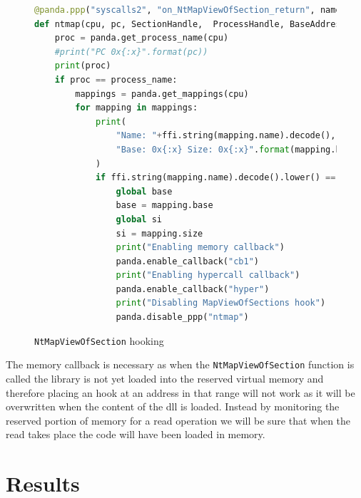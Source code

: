 \begin{figure}[htp]
\centering
\begin{lstlisting}[language=Python] 
@panda.ppp("syscalls2", "on_NtMapViewOfSection_return", name="ntmap")
def ntmap(cpu, pc, SectionHandle,  ProcessHandle, BaseAddress, ZeroBits, CommitSize, SectionOffset, ViewSize, InheritDisposition, AllocationType, Win32Protect):
    proc = panda.get_process_name(cpu)
    #print("PC 0x{:x}".format(pc))
    print(proc)
    if proc == process_name:
        mappings = panda.get_mappings(cpu)
        for mapping in mappings:
            print(
                "Name: "+ffi.string(mapping.name).decode(),
                "Base: 0x{:x} Size: 0x{:x}".format(mapping.base,mapping.size)
            )
            if ffi.string(mapping.name).decode().lower() == "kernel32.dll":
                global base
                base = mapping.base
                global si
                si = mapping.size
                print("Enabling memory callback")
                panda.enable_callback("cb1")
                print("Enabling hypercall callback")
                panda.enable_callback("hyper")
                print("Disabling MapViewOfSections hook")
                panda.disable_ppp("ntmap")
\end{lstlisting}
\caption{\lstinline{NtMapViewOfSection} hooking}
\label{fig:ntmap}
\end{figure}

The memory callback is necessary as when the \lstinline{NtMapViewOfSection} function is called the library is not yet loaded into the reserved virtual memory and therefore placing an hook at an address in that range will not work as it will be overwritten when the content of the dll is loaded. Instead by monitoring the reserved portion of memory for a read operation we will be sure that when the read takes place the code will have been loaded in memory. 


\section{Results}

